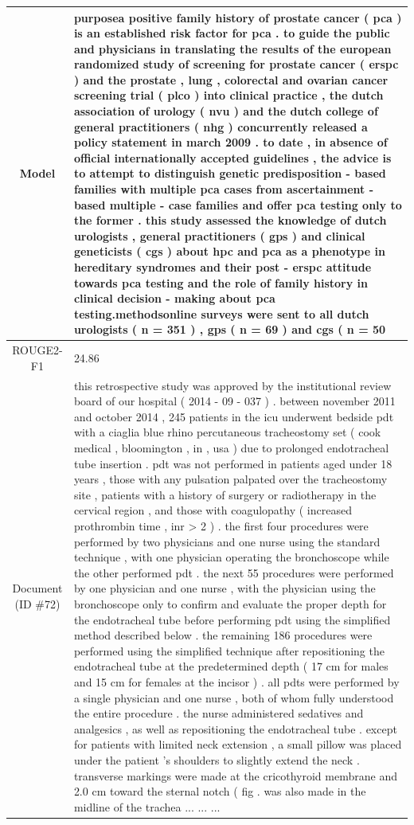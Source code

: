 \begin{table}[bth!]
\begin{tabular}{c|p{}}
\\ \hline
Model & 
purposea positive family history of prostate cancer ( pca ) is an established risk factor for pca . to guide the public and physicians in translating the results of the european randomized study of screening for prostate cancer ( erspc ) and the prostate , lung , colorectal and ovarian cancer screening trial ( plco ) into clinical practice , the dutch association of urology ( nvu ) and the dutch college of general practitioners ( nhg ) concurrently released a policy statement in march 2009 . to date , in absence of official internationally accepted guidelines , the advice is to attempt to distinguish genetic predisposition - based families with multiple pca cases from ascertainment - based multiple - case families and offer pca testing only to the former . this study assessed the knowledge of dutch urologists , general practitioners ( gps ) and clinical geneticists ( cgs ) about hpc and pca as a phenotype in hereditary syndromes and their post - erspc attitude towards pca testing and the role of family history in clinical decision - making about pca testing.methodsonline surveys were sent to all dutch urologists ( n = 351 ) , gps ( n = 69 ) and cgs ( n = 50 
\\ \hline
ROUGE2-F1 & 
24.86
\\ \hline
\makecell{Document\\(ID \#72)} & 
this retrospective study was approved by the institutional review board of our hospital ( 2014 - 09 - 037 ) . between november 2011 and october 2014 , 245 patients in the icu underwent bedside pdt with a ciaglia blue rhino percutaneous tracheostomy set ( cook medical , bloomington , in , usa ) due to prolonged endotracheal tube insertion . pdt was not performed in patients aged under 18 years , those with any pulsation palpated over the tracheostomy site , patients with a history of surgery or radiotherapy in the cervical region , and those with coagulopathy ( increased prothrombin time , inr > 2 ) . the first four procedures were performed by two physicians and one nurse using the standard technique , with one physician operating the bronchoscope while the other performed pdt . the next 55 procedures were performed by one physician and one nurse , with the physician using the bronchoscope only to confirm and evaluate the proper depth for the endotracheal tube before performing pdt using the simplified method described below . the remaining 186 procedures were performed using the simplified technique after repositioning the endotracheal tube at the predetermined depth ( 17 cm for males and 15 cm for females at the incisor ) . all pdts were performed by a single physician and one nurse , both of whom fully understood the entire procedure . the nurse administered sedatives and analgesics , as well as repositioning the endotracheal tube . except for patients with limited neck extension , a small pillow was placed under the patient 's shoulders to slightly extend the neck . transverse markings were made at the cricothyroid membrane and 2.0 cm toward the sternal notch ( fig . was also made in the midline of the trachea ... ... ... 

\end{tabular}
\end{table}
